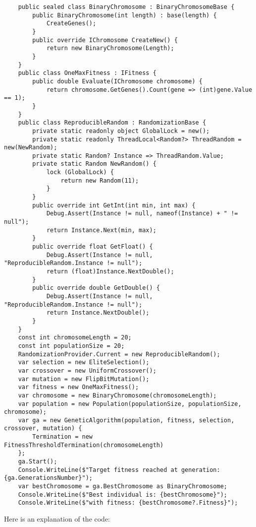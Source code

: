   \begin{verbatim}
    public sealed class BinaryChromosome : BinaryChromosomeBase {
        public BinaryChromosome(int length) : base(length) {
            CreateGenes();
        }
        public override IChromosome CreateNew() {
            return new BinaryChromosome(Length);
        }
    }
    public class OneMaxFitness : IFitness {
        public double Evaluate(IChromosome chromosome) {
            return chromosome.GetGenes().Count(gene => (int)gene.Value == 1);
        }
    }
    public class ReproducibleRandom : RandomizationBase {
        private static readonly object GlobalLock = new();
        private static readonly ThreadLocal<Random?> ThreadRandom = new(NewRandom);
        private static Random? Instance => ThreadRandom.Value;
        private static Random NewRandom() {
            lock (GlobalLock) {
                return new Random(11);
            }
        }
        public override int GetInt(int min, int max) {
            Debug.Assert(Instance != null, nameof(Instance) + " != null");
            return Instance.Next(min, max);
        }
        public override float GetFloat() {
            Debug.Assert(Instance != null, "ReproducibleRandom.Instance != null");
            return (float)Instance.NextDouble();
        }
        public override double GetDouble() {
            Debug.Assert(Instance != null, "ReproducibleRandom.Instance != null");
            return Instance.NextDouble();
        }
    }
    const int chromosomeLength = 20;
    const int populationSize = 20;
    RandomizationProvider.Current = new ReproducibleRandom();
    var selection = new EliteSelection();
    var crossover = new UniformCrossover();
    var mutation = new FlipBitMutation();
    var fitness = new OneMaxFitness();
    var chromosome = new BinaryChromosome(chromosomeLength);
    var population = new Population(populationSize, populationSize, chromosome);
    var ga = new GeneticAlgorithm(population, fitness, selection, crossover, mutation) {
        Termination = new FitnessThresholdTermination(chromosomeLength)
    };
    ga.Start();
    Console.WriteLine($"Target fitness reached at generation: {ga.GenerationsNumber}");
    var bestChromosome = ga.BestChromosome as BinaryChromosome;
    Console.WriteLine($"Best individual is: {bestChromosome}");
    Console.WriteLine($"with fitness: {bestChromosome?.Fitness}");
  \end{verbatim}

  Here is an explanation of the code:


